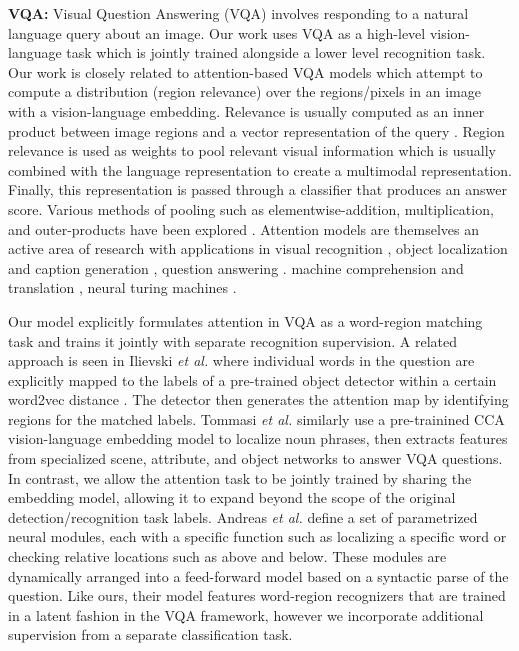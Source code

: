 \documentclass[10pt,twocolumn,letterpaper]{article}
\begin{document}
\noindent \textbf{VQA:} Visual Question Answering (VQA) involves responding to a natural language query about an image. Our work uses VQA as a high-level vision-language task which is jointly trained alongside a lower level recognition task. Our work is closely related to attention-based VQA models \cite{fukui2016multimodal,ilievski2016focused,lu2016hierarchical,xu2016ask,shih2016look,yang2015stacked,andreas2016neural,andreas2016learning, kumar2015ask,tommasi2016bmvc} which attempt to compute a distribution (region relevance) over the regions/pixels in an image with a vision-language embedding. Relevance is usually computed as an inner product between image regions and a vector representation of the query \cite{xu2016ask, shih2016look, ilievski2016focused,lu2016hierarchical}. Region relevance is used as weights to pool relevant visual information which is usually combined with the language representation to create a multimodal representation. Finally, this representation is passed through a classifier that produces an answer score. Various methods of pooling such as elementwise-addition, multiplication, and outer-products have been explored \cite{yang2015stacked, fukui2016multimodal}. Attention models are themselves an active area of research with applications in visual recognition \cite{mnih2014nips,jaderberg2015nips}, object localization and caption generation \cite{johnson2015arxiv}, question answering \cite{weston2014memory,sukhbaatar2015end,kumar2015ask}. machine comprehension \cite{hermann2015teaching} and translation \cite{bahdanau2014arxiv,wu2016arxiv}, neural turing machines \cite{graves2014arxiv}.
  
  Our model explicitly formulates attention in VQA as a word-region matching task and trains it jointly with separate recognition supervision. A related approach is seen in Ilievski \textit{et al.} \cite{ilievski2016focused} where individual words in the question are explicitly mapped to the labels of a pre-trained object detector within a certain word2vec distance \cite{mikolov2013efficient}. The detector then generates the attention map by identifying regions for the matched labels. Tommasi \textit{et al.} similarly use a pre-trainined CCA \cite{gong2014improving} vision-language embedding model to localize noun phrases, then extracts features from specialized scene, attribute, and object networks to answer VQA questions. In contrast, we allow the attention task to be jointly trained by sharing the embedding model, allowing it to expand beyond the scope of the original detection/recognition task labels. Andreas \textit{et al.} \cite{andreas2016neural,andreas2016learning} define a set of parametrized neural modules, each with a specific function such as localizing a specific word or checking relative locations such as above and below. These modules are dynamically arranged into a feed-forward model based on a syntactic parse of the question. Like ours, their model features word-region recognizers that are trained in a latent fashion in the VQA framework, however we incorporate additional supervision from a separate classification task.
\end{document}
